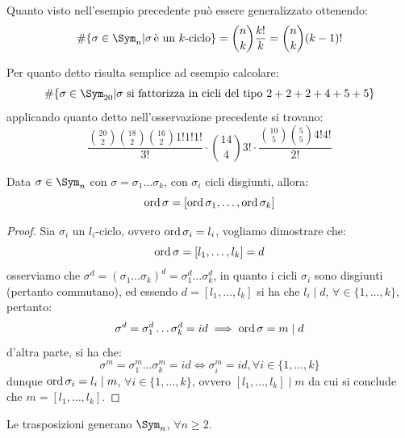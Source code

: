 \documentclass[11pt]{scrartcl}
\begin{document}
\begin{remark}
    Quanto visto nell'esempio precedente può essere generalizzato ottenendo:
        \[ \#\{\sigma \in \Sym_n | \sigma\,\text{è un $k$-ciclo}\} = \binom{n}{k}\frac{k!}{k} = \binom{n}{k}(k-1)!
            \]
\end{remark}

\begin{example}
    Per quanto detto risulta semplice ad esempio calcolare:
        \[ \#\{\sigma \in \Sym_{20} | \text{$\sigma$ si fattorizza in cicli del tipo $2+2+2+4+5+5$}\}
            \]
    applicando quanto detto nell'osservazione precedente si trovano:
        \[ \frac{\binom{20}{2}\binom{18}{2}\binom{16}{2}1!1!1!}{3!} \cdot \binom{14}{4}3! \cdot \frac{\binom{10}{5}\binom{5}{5}4!4!}{2!}
            \]
\end{example}

\begin{proposition}
    Data $\sigma \in \Sym_n$ con $\sigma = \sigma_1\ldots\sigma_k$, con $\sigma_i$ cicli disgiunti, allora:
        \[ \operatorname{ord} \sigma = [\operatorname{ord} \sigma_1,\ldots, \operatorname{ord}\sigma_k]
            \]
\end{proposition}

\begin{proof}
    Sia $\sigma_i$ un $l_i$-ciclo, ovvero $\operatorname{ord}\sigma_i = l_i$, vogliamo dimostrare che:
        \[ \operatorname{ord}\sigma = [l_1,\ldots,l_k] = d
            \]
    osserviamo che $\sigma^d = (\sigma_1\ldots\sigma_k)^d = \sigma_1^d\ldots\sigma_k^d$, in quanto i cicli $\sigma_i$ sono disgiunti (pertanto commutano),
    ed essendo $d = [l_1,\ldots,l_k]$ si ha che $l_i \mid d$, $\forall \in \{1,\ldots,k\}$, pertanto:
        \[ \sigma^d = \sigma_1^d\ldots\sigma_k^d = id \implies \operatorname{ord} \sigma = m \mid d
            \]
    d'altra parte, si ha che:
        \[ \sigma^m = \sigma_1^m\ldots\sigma_k^m = id \iff \sigma_i^m = id, \forall i \in\{1,\ldots,k\}
            \]
    dunque $\operatorname{ord} \sigma_i = l_i \mid m$, $\forall i \in\{1,\ldots,k\}$, ovvero $[l_1,\ldots,l_k] \mid m$ da cui si conclude che $m = [l_1,\ldots,l_k]$.
\end{proof}

\begin{proposition}
    \label{trasp}
    Le trasposizioni generano $\Sym_n$, $\forall n \geq 2$.
\end{proposition}
\end{document}
